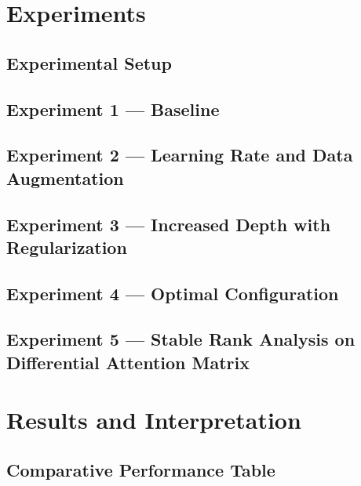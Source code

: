 \documentclass[12pt, a4paper]{article}
\begin{document}
\section{Experiments}

\subsection{Experimental Setup}

\subsection{Experiment 1 --- Baseline}

\subsection{Experiment 2 --- Learning Rate and Data Augmentation}

\subsection{Experiment 3 --- Increased Depth with Regularization}

\subsection{Experiment 4 --- Optimal Configuration}

\subsection{Experiment 5 --- Stable Rank Analysis on Differential Attention Matrix}

\section{Results and Interpretation}

\subsection{Comparative Performance Table}
\end{document}
